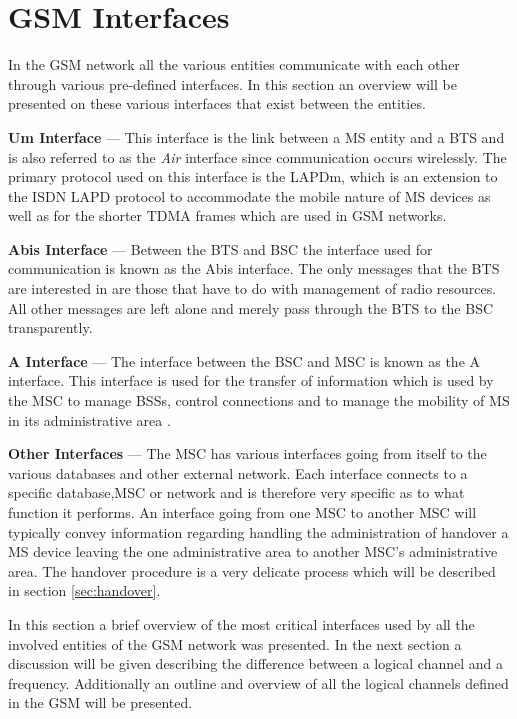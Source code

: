 \section{GSM Interfaces}
\label{sec:gsminterfaces}
In the GSM network all the various entities communicate with each other through various pre-defined interfaces. In this section an overview will be presented on these various interfaces that exist between the entities.
\begin{description}
\item{\textbf{Um Interface}} --- This interface is the link between a MS entity and a BTS and is also referred to as the \emph{Air} interface since communication occurs wirelessly. The primary protocol used on this interface is the LAPDm, which is an extension to the ISDN LAPD protocol to accommodate the mobile nature of MS devices as well as for the shorter TDMA frames which are used in GSM networks\cite{wirelesstelcoMullet,GSMSecurInTeleNetwork}.
\item{\textbf{Abis Interface}} --- Between the BTS and BSC the interface used for communication is known as the Abis interface. The only messages that the BTS are interested in are those that have to do with management of radio resources\cite{wirelesstelcoMullet,GSMSecurInTeleNetwork}. All other messages are left alone and merely pass through the BTS to the BSC transparently.
\item{\textbf{A Interface}} --- The interface between the BSC and MSC is known as the A interface. This interface is used for the transfer of information which is used by the MSC to manage BSSs, control connections and to manage the mobility of MS in its administrative area \cite{wirelesstelcoMullet,GSMArchitectureProtocolsServices}.
\item{\textbf{Other Interfaces}} --- The MSC has various interfaces going from itself to the various databases and other external network. Each interface connects to a specific database,MSC or network and is therefore very specific as to what function it performs\cite{wirelesstelcoMullet,GSMArchitectureProtocolsServices}. An interface going from one MSC to another MSC will typically convey information regarding handling the administration of handover a MS device leaving the one administrative area to another MSC's administrative area. The handover procedure is a very delicate process which will be described in section \ref{sec:handover}.
\end{description}

In this section a brief overview of the most critical interfaces used by all the involved entities of the GSM network was presented. In the next section a discussion will be given describing the difference between a logical channel and a frequency. Additionally an outline and overview of all the logical channels defined in the GSM will be presented. 
